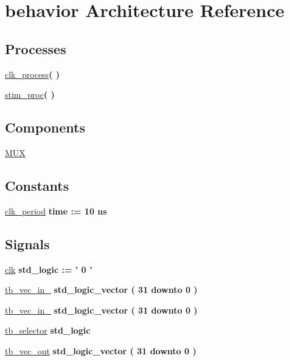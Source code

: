 \hypertarget{classmux__tb_1_1behavior}{\section{behavior \-Architecture \-Reference}
\label{classmux__tb_1_1behavior}
}
\*
\*
\subsection*{\-Processes}
 \begin{DoxyCompactItemize}
\item 
\hyperlink{classmux__tb_1_1behavior_ac5bb218131b813f7908ec89476b31fca}{clk\-\_\-process}{\bfseries  (  )}
\item 
\hyperlink{classmux__tb_1_1behavior_ad2efa6785cff833c341e27596b21aeb5}{stim\-\_\-proc}{\bfseries  (  )}
\end{DoxyCompactItemize}
\subsection*{\-Components}
 \begin{DoxyCompactItemize}
\item 
\hyperlink{classmux__tb_1_1behavior_a73760dea8da2e6f41a8c18e8bf78aa35}{\-M\-U\-X}  {\bfseries }  
\end{DoxyCompactItemize}
\subsection*{\-Constants}
 \begin{DoxyCompactItemize}
\item 
\hyperlink{classmux__tb_1_1behavior_a204a2fe2cd2e77cb28f30aeab011e19e}{clk\-\_\-period} {\bfseries time  \-:=  10  ns } 
\end{DoxyCompactItemize}
\subsection*{\-Signals}
 \begin{DoxyCompactItemize}
\item 
\hyperlink{classmux__tb_1_1behavior_aa4a50c298077fcba21ee7b8037fae196}{clk} {\bfseries std\-\_\-logic  \-:= '  0  ' } 
\item 
\hyperlink{classmux__tb_1_1behavior_aafcce8e7a57f78ec316c2d09baaf938d}{tb\-\_\-vec\-\_\-in\-\_} {\bfseries std\-\_\-logic\-\_\-vector (   31    downto    0  ) } 
\item 
\hyperlink{classmux__tb_1_1behavior_ab2752542a9d10d877b272c9484b29df9}{tb\-\_\-vec\-\_\-in\-\_} {\bfseries std\-\_\-logic\-\_\-vector (   31    downto    0  ) } 
\item 
\hyperlink{classmux__tb_1_1behavior_a25ec99ba02878236496471f1c0b4aca1}{tb\-\_\-selector} {\bfseries std\-\_\-logic } 
\item 
\hyperlink{classmux__tb_1_1behavior_a1ef2cbfab26351585dd50c0f22be5fa6}{tb\-\_\-vec\-\_\-out} {\bfseries std\-\_\-logic\-\_\-vector (   31    downto    0  ) } 
\end{DoxyCompactItemize}


